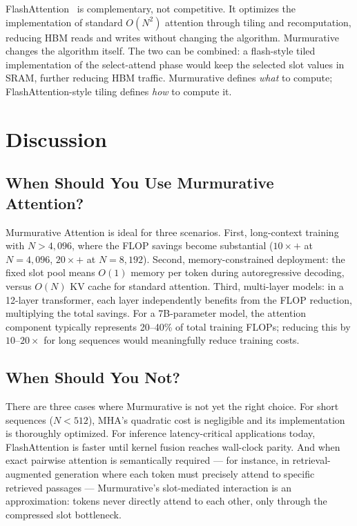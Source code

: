 \documentclass{article}
\begin{document}
FlashAttention~\cite{dao2022flashattention,dao2023flashattention2} is complementary, not competitive. It optimizes the implementation of standard $O(N^2)$ attention through tiling and recomputation, reducing HBM reads and writes without changing the algorithm. Murmurative changes the algorithm itself. The two can be combined: a flash-style tiled implementation of the select-attend phase would keep the selected slot values in SRAM, further reducing HBM traffic. Murmurative defines \textit{what} to compute; FlashAttention-style tiling defines \textit{how} to compute it.

\section{Discussion}

\subsection{When Should You Use Murmurative Attention?}

Murmurative Attention is ideal for three scenarios. First, long-context training with $N > 4{,}096$, where the FLOP savings become substantial ($10\times+$ at $N=4{,}096$, $20\times+$ at $N=8{,}192$). Second, memory-constrained deployment: the fixed slot pool means $O(1)$ memory per token during autoregressive decoding, versus $O(N)$ KV cache for standard attention. Third, multi-layer models: in a 12-layer transformer, each layer independently benefits from the FLOP reduction, multiplying the total savings. For a 7B-parameter model, the attention component typically represents 20--40\% of total training FLOPs; reducing this by $10$--$20\times$ for long sequences would meaningfully reduce training costs.

\subsection{When Should You Not?}

There are three cases where Murmurative is not yet the right choice. For short sequences ($N < 512$), MHA's quadratic cost is negligible and its implementation is thoroughly optimized. For inference latency-critical applications today, FlashAttention is faster until kernel fusion reaches wall-clock parity. And when exact pairwise attention is semantically required — for instance, in retrieval-augmented generation where each token must precisely attend to specific retrieved passages — Murmurative's slot-mediated interaction is an approximation: tokens never directly attend to each other, only through the compressed slot bottleneck.
\end{document}
